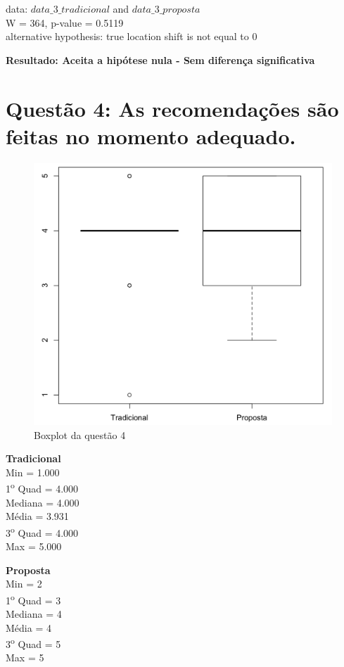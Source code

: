 \noindent
data:  $data\_3\_tradicional$ and $data\_3\_proposta$\\
W = 364, p-value = 0.5119\\
alternative hypothesis: true location shift is not equal to 0

\noindent
\textbf{Resultado: Aceita a hipótese nula - Sem diferença significativa}

\newpage
\section{Questão 4: As recomendações são feitas no momento adequado.}

\begin{figure}[htb]
  \caption{\label{fig:questao4-boxplot}Boxplot da questão 4}
  \begin{center}
      \includegraphics[scale=0.4]{./Figuras/questao4-boxplot.png}
  \end{center}
\end{figure}

\begin{multicols}{2}

\noindent\textbf{Tradicional}\\
Min = 1.000\\
1\textsuperscript{o} Quad = 4.000\\
Mediana = 4.000\\
Média = 3.931\\
3\textsuperscript{o} Quad = 4.000\\
Max = 5.000\\
\columnbreak

\noindent\textbf{Proposta}\\
Min = 2\\
1\textsuperscript{o} Quad = 3\\
Mediana = 4\\
Média = 4\\
3\textsuperscript{o} Quad = 5\\
Max = 5
\end{multicols}

